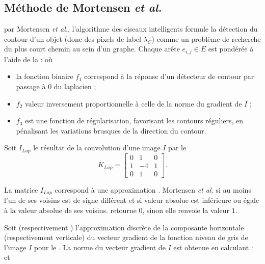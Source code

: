 \subsection{Méthode de Mortensen \textit{et al.}}

 par Mortensen \textit{et al.}, l'algorithme des ciseaux intelligents \cite{mortensen1995intelligent} formule la détection du contour d'un objet (donc des pixels de label $\lambda_{C}$) comme un problème de recherche du plus court chemin au sein d'un graphe. Chaque arête $e_{i,j} \in E$ est pondérée à l'aide de la  : 
où
\begin{itemize}
\item la fonction binaire $f_{1}$ correspond à la réponse d'un détecteur de contour par passage à 0 du laplacien ;
\item $f_{2}$  valeur inversement proportionnelle à celle de la norme du gradient de $I$ ;
\item $f_{3}$ est une fonction de régularisation, favorisant les contours réguliers, en pénalisant les variations brusques de la direction du contour.
\end{itemize}

Soit $I_{Lap}$ le résultat de la convolution d'une image $I$ par le 
\begin{equation}
K_{Lap} = 
\label{eq:sota:laplacien}
\begin{bmatrix}
0 & 1 & 0\\
1 & -4 & 1\\
0 & 1 & 0
\end{bmatrix}\text{.}
\end{equation}

La matrice $I_{Lap}$ correspond à une approximation  . Mortensen \textit{et al.}  si au moins l'un de ses voisins est de signe différent et si  valeur absolue est inférieure ou égale à la valeur absolue de ses voisins.  retourne 0, sinon elle renvoie la valeur $1$.

Soit  (respectivement ) l'approximation discrète de la composante horizontale (respectivement verticale) du vecteur gradient de la fonction niveau de gris de l'image $I$ pour le . La norme du vecteur gradient de $I$ est obtenue en calculant :
et

